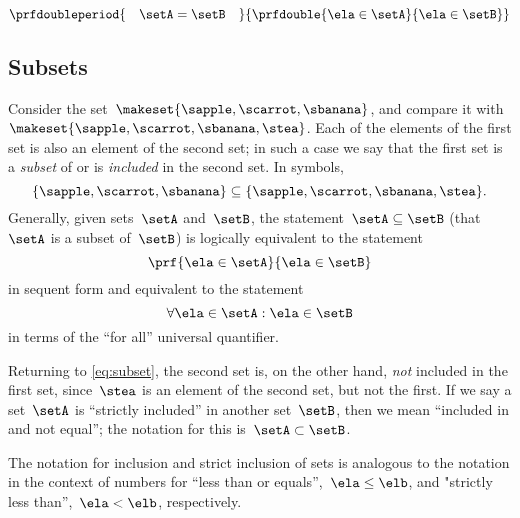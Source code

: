 \begin{equation*}
    \prfdoubleperiod{
        \quad \setA = \setB \quad
    }{
        \prfdouble{
            \ela \in \setA
        }{
            \ela \in \setB
        }
    }
\end{equation*}


\subsection{Subsets}

Consider the set~$\makeset{ \sapple, \scarrot, \sbanana }$, and compare it with~$\makeset{ \sapple, \scarrot, \sbanana, \stea }$.
Each of the elements of the first set is also an element of the second set;
in such a case we say that the first set is a \emph{subset} of or is \emph{included} in the second set.
In symbols,
%
\begin{equation}
    \label{eq:subset}
    \{ \sapple, \scarrot, \sbanana \} \subseteq \{ \sapple, \scarrot, \sbanana, \stea \}.
\end{equation}
%
Generally, given sets~$\setA$ and~$\setB$, the statement~$\setA \subseteq \setB$ (that~$\setA$ is a subset of~$\setB$) is logically equivalent to the statement
%
\begin{equation}
    \prf{
        \ela \in \setA
    }{
        \ela \in \setB
    }
\end{equation}
in sequent form and equivalent to the statement
\begin{equation}\label{eq:inclusion-via-quantifier}
    \forall \ela \in \setA : \ela \in \setB
\end{equation}
in terms of the ``for all'' universal quantifier.

Returning to \cref{eq:subset}, the second set is, on the other hand, \emph{not} included in the first set, since~$\stea$ is an element of the second set, but not the first.
If we say a set~$\setA$ is ``strictly included'' in another set~$\setB$, then we mean ``included in and not equal''; the notation for this is~$\setA \subset \setB$.

The notation for inclusion and strict inclusion of sets is analogous to the notation in the context of numbers for ``less than or equals'',~$\ela \leq \elb$,  and "strictly less than'',~$\ela < \elb$, respectively.

